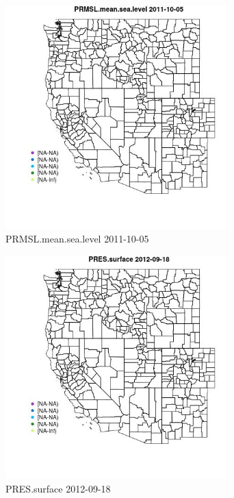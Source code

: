 \clearpage 

\begin{figure} 
\centering  
\includegraphics[width=0.77\textwidth]{Code_Outputs/ML_input_report_ML_input_PM25_Step5_part_d_de_duplicated_aves_ML_input_MapObsPRMSLmeansealevel2011-10-05.jpg} 
\caption{\label{fig:ML_input_report_ML_input_PM25_Step5_part_d_de_duplicated_aves_ML_inputMapObsPRMSLmeansealevel2011-10-05}PRMSL.mean.sea.level 2011-10-05} 
\end{figure} 
 

\begin{figure} 
\centering  
\includegraphics[width=0.77\textwidth]{Code_Outputs/ML_input_report_ML_input_PM25_Step5_part_d_de_duplicated_aves_ML_input_MapObsPRESsurface2012-09-18.jpg} 
\caption{\label{fig:ML_input_report_ML_input_PM25_Step5_part_d_de_duplicated_aves_ML_inputMapObsPRESsurface2012-09-18}PRES.surface 2012-09-18} 
\end{figure} 
 

